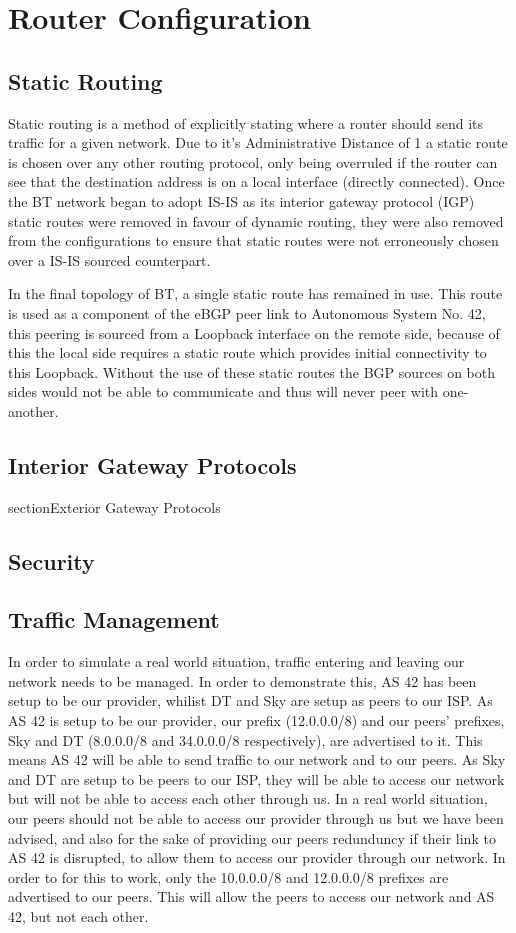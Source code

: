 \chapter{Router Configuration} \section{Static Routing} Static routing is a
method of explicitly stating where a router should send its traffic for a given
network. Due to it's Administrative Distance of 1 a static route is chosen over
any other routing protocol, only being overruled if the router can see that the
destination address is on a local interface (directly connected). Once the BT
network began to adopt IS-IS as its interior gateway protocol (IGP) static
routes were removed in favour of dynamic routing, they were also removed from
the configurations to ensure that static routes were not erroneously chosen over
a IS-IS sourced counterpart.

In the final topology of BT, a single static route has remained in use. This
route is used as a component of the eBGP peer link to Autonomous System No. 42,
this peering is sourced from a Loopback interface on the remote side, because of
this the local side requires a static route which provides initial connectivity
to this Loopback. Without the use of these static routes the BGP sources on both
sides would not be able to communicate and thus will never peer with one-
another.

\section{Interior Gateway Protocols} section{Exterior Gateway Protocols}
\section{Security}

\section{Traffic Management}
In order to simulate a real world situation, traffic entering and leaving our
network needs to be managed. In order to demonstrate this, AS 42 has been setup
to be our provider, whilist DT and Sky are setup as peers to our ISP. As AS 42
is setup to be our provider, our prefix (12.0.0.0/8) and our peers' prefixes,
Sky and DT (8.0.0.0/8 and 34.0.0.0/8 respectively), are advertised to it. This
means AS 42 will be able to send traffic to our network and to our peers. As Sky
and DT are setup to be peers to our ISP, they will be able to access our network
but will not be able to access each other through us. In a real world situation,
our peers should not be able to access our provider through us but we have been
advised, and also for the sake of providing our peers redunduncy if their link
to AS 42 is disrupted, to allow them to access our provider through our network.
In order to for this to work, only the 10.0.0.0/8 and 12.0.0.0/8 prefixes are
advertised to our peers. This will allow the peers to access our network and AS
42, but not each other.
